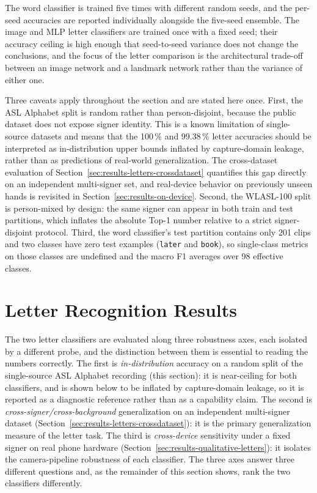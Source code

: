 The word classifier is trained five times with different random seeds,
and the per-seed accuracies are reported individually alongside the
five-seed ensemble. The image and MLP letter classifiers are trained
once with a fixed seed; their accuracy ceiling is high enough that
seed-to-seed variance does not change the conclusions, and the focus of
the letter comparison is the architectural trade-off between an image
network and a landmark network rather than the variance of either one.

Three caveats apply throughout the section and are stated here once.
First, the ASL Alphabet split is random rather than person-disjoint,
because the public dataset does not expose signer identity. This is a
known limitation of single-source datasets and means that the
100\,\% and 99.38\,\% letter accuracies should be interpreted as
in-distribution upper bounds inflated by capture-domain leakage,
rather than as predictions of real-world generalization. The cross-dataset evaluation of
Section~\ref{sec:results-letters-crossdataset} quantifies this gap
directly on an independent multi-signer set, and real-device behavior
on previously unseen hands is revisited in
Section~\ref{sec:results-on-device}. Second, the WLASL-100
split is person-mixed by design: the same signer can appear in both
train and test partitions, which inflates the absolute Top-1 number
relative to a strict signer-disjoint protocol. Third, the word
classifier's test partition contains only 201 clips and two classes
have zero test examples (\texttt{later} and \texttt{book}), so
single-class metrics on those classes are undefined and the macro
F1 averages over 98 effective classes.

\section{Letter Recognition Results}
\label{sec:results-letters}

The two letter classifiers are evaluated along three robustness axes,
each isolated by a different probe, and the distinction between them is
essential to reading the numbers correctly. The first is
\emph{in-distribution} accuracy on a random split of the single-source
ASL Alphabet recording (this section): it is near-ceiling for both
classifiers, and is shown below to be inflated by capture-domain
leakage, so it is reported as a diagnostic reference rather than as a
capability claim. The second is \emph{cross-signer/cross-background}
generalization on an independent multi-signer dataset
(Section~\ref{sec:results-letters-crossdataset}): it is the primary
generalization measure of the letter task. The third is
\emph{cross-device} sensitivity under a fixed signer on real phone
hardware (Section~\ref{sec:results-qualitative-letters}): it isolates
the camera-pipeline robustness of each classifier. The three axes
answer three different questions and, as the remainder of this section
shows, rank the two classifiers differently.

